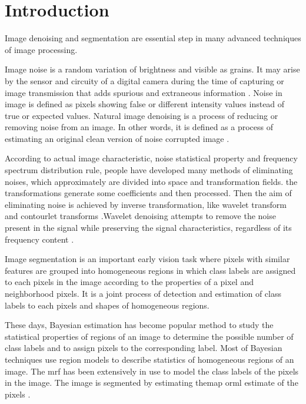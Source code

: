 \chapter{Introduction}
\label{chap:introduction}
Image denoising and segmentation are essential step in many advanced techniques of image processing. 

Image noise is a random variation of brightness and visible as grains. It may arise
by the sensor and circuity of a digital camera during the time of capturing or image
transmission that adds spurious and extraneous information \cite{verma2013comparative}. Noise in image
is defined as pixels showing false or different intensity values instead of true or
expected values. Natural image denoising is a process of reducing or removing
noise from an image. In other words, it is defined as a process of estimating an
original clean version of noise corrupted image \cite{levin2011natural}.

 According to actual image characteristic, noise statistical property and frequency spectrum distribution rule, people have developed many methods of eliminating noises, which approximately are divided into space and transformation fields. the transformations generate some coefficients  and then  processed. Then the aim of eliminating noise is achieved by inverse transformation, like wavelet transform and contourlet transforms \cite{ruikar2011wavelet}\cite{matalon2005image}.Wavelet denoising attempts to remove the noise present in the signal while preserving the signal characteristics, regardless of its frequency content \cite{rangarajan2002image}.

Image segmentation is an important early vision task where pixels with similar features are grouped into homogeneous regions in which  class labels are assigned to each pixels in the image according to the properties of a pixel and neighborhood pixels. It is a joint process of detection and estimation of class labels to each pixels and shapes of homogeneous regions. 

These days, Bayesian estimation has become popular method to study the statistical properties of regions of an image to determine the possible number of class labels and to assign pixels to the corresponding label. Most of Bayesian techniques use region models to describe statistics of homogeneous regions of an image. The \gls{mrf} has been extensively in use to model the class labels of the pixels in the image. The image is segmented by estimating the\gls{map}  or\gls{ml} estimate of the pixels\cite{choi1999image} \cite{voisin2014supervised}.

